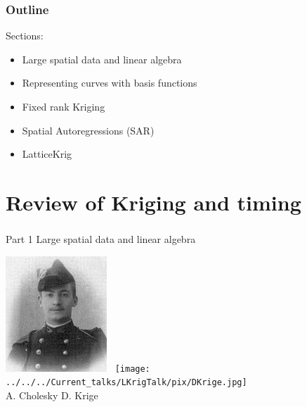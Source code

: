 \documentclass[english]{beamer} %
\def\Myspace{{\vspace*{.125in}}}
\begin{document}
\begin{frame} %
\frametitle{Outline}

Sections:
\begin{itemize}
\item   Large spatial data and linear algebra
\item  Representing curves with basis functions
\item  Fixed rank Kriging
\item  Spatial Autoregressions (SAR)
\item  LatticeKrig 


\end{itemize}

\end{frame} %
  
\section{Review of Kriging and timing}
\begin{frame} %
\frametitle{}
{\huge Part 1 Large spatial data and linear algebra}
\Myspace

\includegraphics[width=1.5in]{pix/Andre_Cholesky.jpg} \ \texttt{[image: ../../../Current\_talks/LKrigTalk/pix/DKrige.jpg]} \\
A. Cholesky \hspace{1in} D. Krige

\end{frame} %
\end{document}
